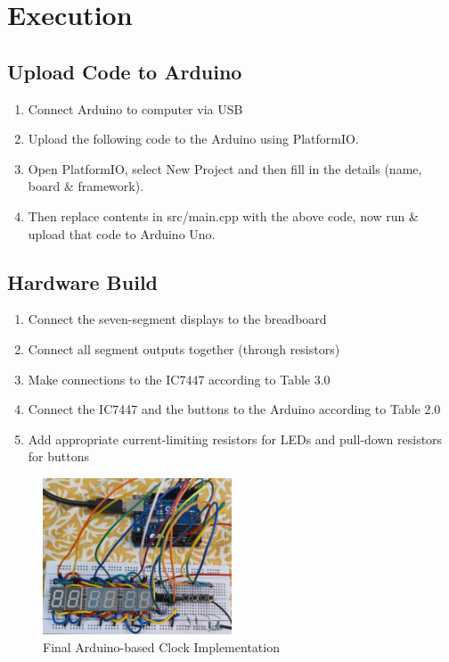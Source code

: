 \section{Execution}
\subsection{Upload Code to Arduino}
\begin{enumerate}
    \item Connect Arduino to computer via USB
    \item Upload the following code to the Arduino using PlatformIO.
\item Open PlatformIO, select New Project and then fill in the details (name, board \& framework).
\item Then replace contents in src/main.cpp with the above code, now run \& upload that code to Arduino Uno.
\end{enumerate}

\subsection{Hardware Build}
\begin{enumerate}
    \item Connect the seven-segment displays to the breadboard
    \item Connect all segment outputs together (through resistors)
    \item Make connections to the IC7447 according to Table 3.0
    \item Connect the IC7447 and the buttons to the Arduino according to Table 2.0
    \item Add appropriate current-limiting resistors for LEDs and pull-down resistors for buttons
\end{enumerate}

\begin{figure}[ht]
\centering
\includegraphics[width=0.5\textwidth]{figs/clock.jpg}
\caption{Final Arduino-based Clock Implementation}
\end{figure}

